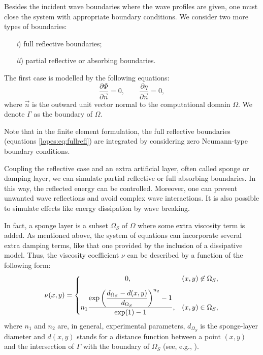 Besides the incident wave boundaries 
 where the wave profiles
are given, one must close the system with appropriate
boundary conditions. 
We consider two more types of
boundaries:
\begin{itemize}
\item[{\it i})] full reflective boundaries;
\item[{\it  ii})] partial reflective or absorbing boundaries. 
\end{itemize}
The first case is modelled by the following equations:
\begin{equation}\label{lopes:eq:fullrefl}
\frac{\partial \Phi}{\partial \vec{n}}=0,\qquad\frac{\partial \eta}{\partial \vec{n}}=0,
\end{equation}
where \(\vec{n}\) is the outward unit vector normal to the
computational domain \(\Omega\).
We  denote  \(\Gamma\) as  the boundary of \(\Omega\). 

Note that  in  the finite element formulation, the full
reflective boundaries (equations \eqref{lopes:eq:fullrefl})  are integrated by
considering zero Neumann-type boundary conditions.

Coupling the  reflective case and an extra artificial  
  layer, often called sponge  or damping layer,
we can simulate partial reflective or full absorbing boundaries. 
In this way, the  reflected energy
can be controlled. Moreover, one can prevent unwanted wave
  reflections and avoid complex wave interactions. 
It is also possible to simulate effects like energy dissipation by wave breaking.
  
In fact, a sponge layer is a
subset \(\Omega_S\) of \(\Omega\) where 
some extra viscosity term is added. 
As mentioned above, the system of equations can incorporate
several extra damping terms, like that one provided by the
inclusion of  a dissipative model. Thus, the viscosity
coefficient \(\nu\) can be described  by a
 function of the following form:
\begin{equation}
\nu(x,y)=
\left\{
\begin{matrix}
0,& (x,y)\not\in\Omega_S ,\vspace{0.3cm}\\
\displaystyle
n_1\frac{\displaystyle\exp{\left(\frac{d_{\Omega_S}-d(x,y)}{d_{\Omega_S}}\right)^{n_2}}-1}{\exp(1)-1},&
(x,y) \in\Omega_S,
\end{matrix}
\right.
\end{equation}  
where \(n_1\) and  \(n_2\) are, in general, experimental
 parameters, \(d_{\Omega_S}\) is  the sponge-layer diameter and
 \(d(x,y)\)
stands for a distance function between a point \((x,y)\) and
 the intersection of \(\Gamma\) with the boundary
 of \(\Omega_S\) (see, e.g., \cite{Walkley1999}). 

